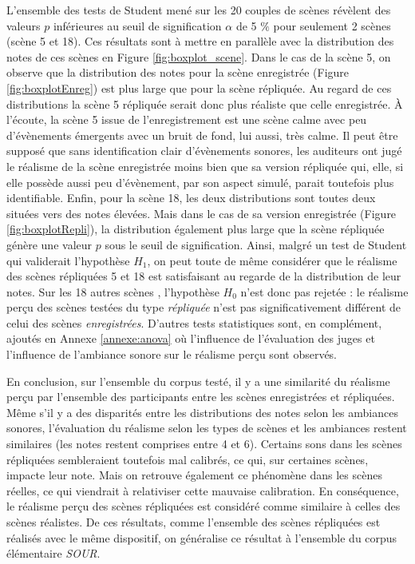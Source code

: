 L'ensemble des tests de Student mené sur les 20 couples de scènes révèlent des valeurs $p$ inférieures au seuil de signification $\alpha$ de 5 $\%$ pour seulement 2 scènes (scène 5 et 18). Ces résultats sont à mettre en parallèle avec la distribution des notes de ces scènes en Figure \ref{fig:boxplot_scene}. Dans le cas de la scène 5, on observe que la distribution des notes pour la scène enregistrée (Figure \ref{fig:boxplotEnreg}) est plus large que pour la scène répliquée. Au regard de ces distributions la scène 5 répliquée serait donc plus réaliste que celle enregistrée. À l'écoute, la scène 5 issue de l'enregistrement est une scène calme avec peu d'évènements émergents avec un bruit de fond, lui aussi, très calme. Il peut être supposé que sans identification clair d'évènements sonores, les auditeurs ont jugé le réalisme de la scène enregistrée moins bien que sa version répliquée qui, elle, si elle possède aussi peu d'évènement, par son aspect simulé, parait toutefois plus identifiable.
Enfin, pour la scène 18, les deux distributions sont toutes deux situées vers des notes élevées. Mais dans le cas de sa version enregistrée (Figure \ref{fig:boxplotRepli}), la distribution également plus large que la scène répliquée génère une valeur $p$ sous le seuil de signification. Ainsi, malgré un test de Student qui validerait l'hypothèse $H_1$, on peut toute de même considérer que le réalisme des scènes répliquées 5 et 18 est satisfaisant au regarde de la distribution de leur notes.
Sur les 18 autres scènes , l'hypothèse $H_0$ n'est donc pas rejetée : le réalisme perçu des scènes testées du type \textit{répliquée} n'est pas significativement différent de celui des scènes \textit{enregistrées}. D'autres tests statistiques sont, en complément, ajoutés en Annexe \ref{annexe:anova} où l'influence de l'évaluation des juges et l'influence de l'ambiance sonore sur le réalisme perçu sont observés.

En conclusion, sur l'ensemble du corpus testé, il y a une similarité du réalisme perçu par l'ensemble des participants entre les scènes enregistrées et répliquées. Même s'il y a des disparités entre les distributions des notes selon les ambiances sonores, l'évaluation du réalisme selon les types de scènes et les ambiances restent similaires (les notes restent comprises entre 4 et 6). 
Certains sons dans les scènes répliquées sembleraient toutefois mal calibrés, ce qui, sur certaines scènes, impacte leur note. Mais on retrouve également ce phénomène dans les scènes réelles, ce qui viendrait à relativiser cette mauvaise calibration.
En conséquence, le réalisme perçu des scènes répliquées est considéré comme similaire à celles des scènes réalistes. 
De ces résultats, comme l'ensemble des scènes répliquées est réalisés avec le même dispositif, on généralise ce résultat à l'ensemble du corpus élémentaire \textit{SOUR}.\\

